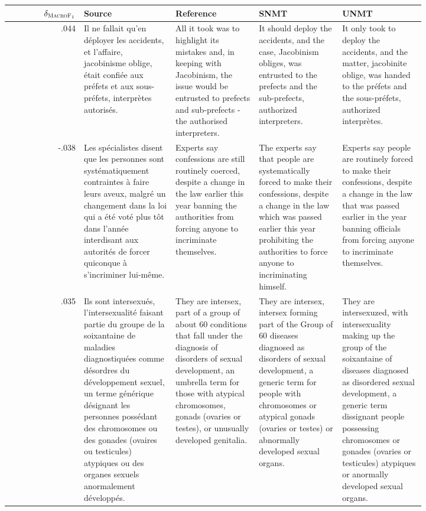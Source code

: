 \begin{table}[ht]
\centering
\fontsize{7.55}{7.55}
\selectfont
\begin{tabular}{r @{\hspace{2mm}} p{0.22\linewidth}p{0.20\linewidth}p{0.20\linewidth}p{0.20\linewidth}}
 $\delta_{\textsc{MacroF}{\text{$_{{1}}$}}}$& Source & Reference & SNMT & UNMT \\\hline\hline
.044 & Il ne fallait qu'en déployer les accidents, et l'affaire, jacobinisme oblige, était confiée aux préfets et aux sous-préfets, interprètes autorisés. & All it took was to highlight its mistakes and, in keeping with Jacobinism, the issue would be entrusted to prefects and sub-prefects - the authorised interpreters. & It should deploy the accidents, and the case, Jacobinism obliges, was entrusted to the prefects and the sub-prefects, authorized interpreters. & It only took to deploy the accidents, and the matter, jacobinite oblige, was handed to the préfets and the sous-préfets, authorized interprètes. \\\hline
-.038 & Les spécialistes disent que les personnes sont systématiquement contraintes à faire leurs aveux, malgré un changement dans la loi qui a été voté plus tôt dans l'année interdisant aux autorités de forcer quiconque à s'incriminer lui-même. & Experts say confessions are still routinely coerced, despite a change in the law earlier this year banning the authorities from forcing anyone to incriminate themselves. & The experts say that people are systematically forced to make their confessions, despite a change in the law which was passed earlier this year prohibiting the authorities to force anyone to incriminating himself. & Experts say people are routinely forced to make their confessions, despite a change in the law that was passed earlier in the year banning officials from forcing anyone to incriminate themselves. \\\hline
.035 & Ils sont intersexués, l'intersexualité faisant partie du groupe de la soixantaine de maladies diagnostiquées comme désordres du développement sexuel, un terme générique désignant les personnes possédant des chromosomes ou des gonades (ovaires ou testicules) atypiques ou des organes sexuels anormalement développés. & They are intersex, part of a group of about 60 conditions that fall under the diagnosis of disorders of sexual development, an umbrella term for those with atypical chromosomes, gonads (ovaries or testes), or unusually developed genitalia. & They are intersex, intersex forming part of the Group of 60 diseases diagnosed as disorders of sexual development, a generic term for people with chromosomes or atypical gonads (ovaries or testes) or abnormally developed sexual organs. & They are intersexuzed, with intersexuality making up the group of the soixantaine of diseases diagnosed as disordered sexual development, a generic term dissignant people possessing chromosomes or gonades (ovaries or testicules) atypiques or anormally developed sexual organs. \\\hline

\end{tabular}
\end{table}
